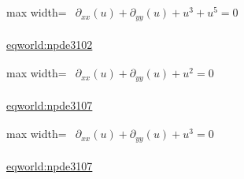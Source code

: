 \documentclass[UTF8,10pt,a4paper,fontset=mac]{ctexart}
\begin{document}
\begin{minipage}{\linewidth}\begin{center}\begin{adjustbox}{max width=\linewidth}$\displaystyle\begin{gathered}\begin{gathered}\partial_{xx}(u)+\partial_{yy}(u)+u^{3}+u^{5}=0\end{gathered}\end{gathered}$\end{adjustbox}\end{center}{\small\href{https://eqworld.ipmnet.ru/en/solutions/npde/npde3102.pdf}{eqworld:npde3102}}\par\end{minipage}\par\vspace{6mm}

\begin{minipage}{\linewidth}\begin{center}\begin{adjustbox}{max width=\linewidth}$\displaystyle\begin{gathered}\begin{gathered}\partial_{xx}(u)+\partial_{yy}(u)+u^{2}=0\end{gathered}\end{gathered}$\end{adjustbox}\end{center}{\small\href{https://eqworld.ipmnet.ru/en/solutions/npde/npde3107.pdf}{eqworld:npde3107}}\par\end{minipage}\par\vspace{6mm}

\begin{minipage}{\linewidth}\begin{center}\begin{adjustbox}{max width=\linewidth}$\displaystyle\begin{gathered}\begin{gathered}\partial_{xx}(u)+\partial_{yy}(u)+u^{3}=0\end{gathered}\end{gathered}$\end{adjustbox}\end{center}{\small\href{https://eqworld.ipmnet.ru/en/solutions/npde/npde3107.pdf}{eqworld:npde3107}}\par\end{minipage}\par\vspace{6mm}
\end{document}
